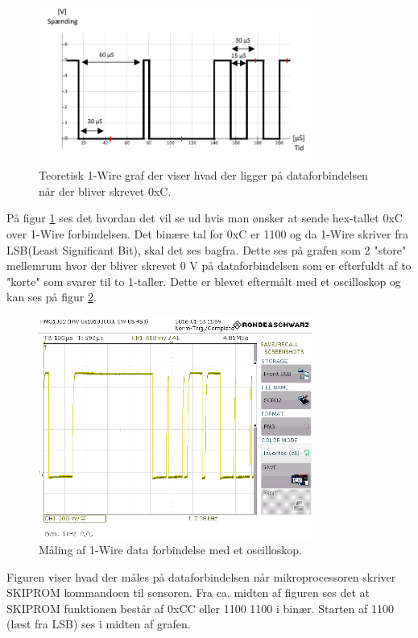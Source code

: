 \begin{figure}[h!]
  \centering
  \includegraphics[width=0.8\textwidth]{figures/onewire.png}
  \caption{Teoretisk 1-Wire graf der viser hvad der ligger på dataforbindelsen når der bliver skrevet 0xC.}
  \label{onewire_graph}
\end{figure}

På figur \ref{onewire_graph} ses det hvordan det vil se ud hvis man ønsker at sende hex-tallet 0xC over 1-Wire forbindelsen. Det binære tal for 0xC er 1100 og da 1-Wire skriver fra LSB(Least Significant Bit), skal det ses bagfra. Dette ses på grafen som 2 "store" mellemrum hvor der bliver skrevet 0 V på dataforbindelsen som er efterfuldt af to "korte" som svarer til to 1-taller. \newline Dette er blevet eftermålt med et oscilloskop og kan ses på figur \ref{SCR02}.


\begin{figure}[h!]
  \centering
  \includegraphics[width=0.8\textwidth]{figures/SCR02.png}
  \caption{Måling af 1-Wire data forbindelse med et oscilloskop.}
  \label{SCR02}
\end{figure}

Figuren viser hvad der måles på dataforbindelsen når mikroprocessoren skriver SKIPROM kommandoen til sensoren.
Fra ca. midten af figuren ses det at SKIPROM funktionen består af 0xCC eller 1100 1100 i binær. Starten af 1100 (læst fra LSB) ses i midten af grafen.